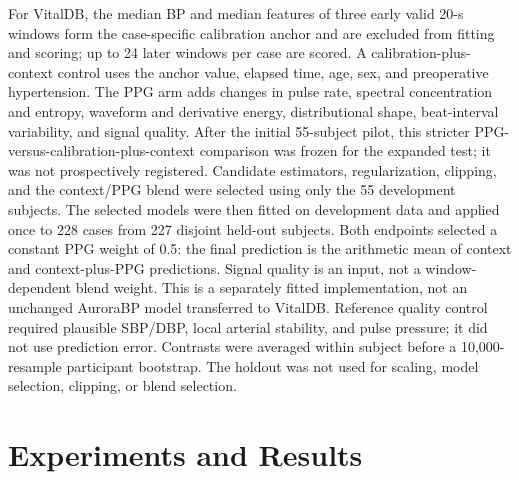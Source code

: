 \documentclass[12pt]{article}
\begin{document}
For VitalDB, the median BP and median features of three early valid 20-s windows form the case-specific calibration anchor and are excluded from fitting and scoring; up to 24 later windows per case are scored. A calibration-plus-context control uses the anchor value, elapsed time, age, sex, and preoperative hypertension. The PPG arm adds changes in pulse rate, spectral concentration and entropy, waveform and derivative energy, distributional shape, beat-interval variability, and signal quality. After the initial 55-subject pilot, this stricter PPG-versus-calibration-plus-context comparison was frozen for the expanded test; it was not prospectively registered. Candidate estimators, regularization, clipping, and the context/PPG blend were selected using only the 55 development subjects. The selected models were then fitted on development data and applied once to 228 cases from 227 disjoint held-out subjects. Both endpoints selected a constant PPG weight of 0.5: the final prediction is the arithmetic mean of context and context-plus-PPG predictions. Signal quality is an input, not a window-dependent blend weight. This is a separately fitted implementation, not an unchanged AuroraBP model transferred to VitalDB. Reference quality control required plausible SBP/DBP, local arterial stability, and pulse pressure; it did not use prediction error. Contrasts were averaged within subject before a 10{,}000-resample participant bootstrap. The holdout was not used for scaling, model selection, clipping, or blend selection.
\section{Experiments and Results}
\label{sec:results}
\end{document}
